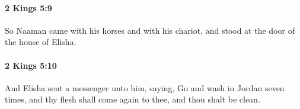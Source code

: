 		\paragraph{2 Kings 5:9} %
			\label{2KINGS-5-9}

			So Naaman came with his horses and with his chariot, and stood at the door of the house of Elisha.


		\paragraph{2 Kings 5:10} %
			\label{2KINGS-5-10}

			And Elisha sent a messenger unto him, saying, Go and wash in Jordan seven times, and thy flesh shall come again to thee, and thou shalt be clean.


